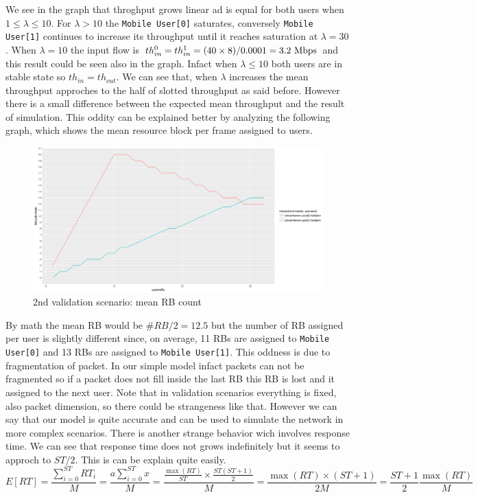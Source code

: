 We see in the graph that throghput grows linear ad is equal for both users when \(1 \leq \lambda \leq 10 \). For \(\lambda > 10 \) the \texttt{Mobile User[0]} saturates, conversely \texttt{Mobile User[1]} continues to increase its throughput until it reaches saturation at \(\lambda = 30\).
When \(\lambda = 10 \) the input flow is \(th_{in}^{0} = th_{in}^{1} = (40 \times 8)/0.0001 = 3.2\textnormal{ Mbps}\) and this result could be seen also in the graph. Infact when \(\lambda \le 10 \) both users are in stable state so \(th_{in} = th_{out}\). We can see that, when \(\lambda\) increases the mean throughput approches to the half of slotted throughput as said before. However there is a small difference between the expected mean throughput and the result of simulation. This oddity can be explained better by analyzing the following graph, which shows the mean resource block per frame assigned to users.
\begin{figure}[H]
  \includegraphics[width=1\textwidth]{images/RBCompvalidation2}
  \caption{2nd validation scenario: mean RB count}
  \label{fig:2nd validation scenario: mean RB count}
\end{figure}
By math the mean RB would be \(\#RB / 2 = 12.5 \) but the number of RB assigned per user is slightly different since, on average, 11 RBs are assigned to \texttt{Mobile User[0]} and 13 RBs are assigned to \texttt{Mobile User[1]}. This oddness is due to fragmentation of packet. In our simple model infact packets can not be fragmented so if a packet does not fill inside the last RB this RB is lost and it assigned to the next user. Note that in validation scenarios everything is fixed, also packet dimension, so there could be strangeness like that. However we can say that our model is quite accurate and can be used to simulate the network in more complex scenarios. 
There is another strange behavior wich involves response time. We can see that response time does not grows indefinitely but it seems to approch to \(ST/2\). This is can be explain quite easily.
\[
	E[RT] = \frac{\sum\limits^{ST}_{i=0} RT_i}{M} = \frac{a\sum\limits^{ST}_{i=0} x}{M} = \frac{ \frac{\max(RT)}{ST} \times \frac{ST(ST+1)}{2}}{M} = \frac{\max(RT) \times (ST+1)}{2M} = \frac{ST+1}{2} \frac{\max(RT)}{M} 
\]